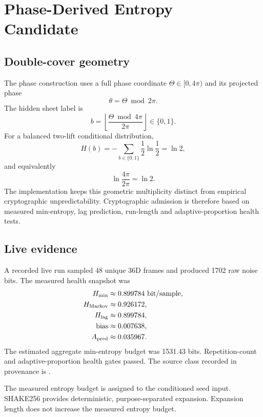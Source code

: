 
\chapter[Phase-Derived Entropy Candidate]{Phase-Derived Entropy\\Candidate}
\section{Double-cover geometry}
The phase construction uses a full phase coordinate $\Theta\in[0,4\pi)$ and its projected phase
\begin{equation}
\theta=\Theta\bmod 2\pi.
\end{equation}
The hidden sheet label is
\begin{equation}
b=\left\lfloor\frac{\Theta\bmod4\pi}{2\pi}\right\rfloor\in\{0,1\}.
\end{equation}
For a balanced two-lift conditional distribution,
\begin{equation}
H(b)=-\sum_{b\in\{0,1\}}\frac12\ln\frac12=\ln2,
\end{equation}
and equivalently
\begin{equation}
\ln\frac{4\pi}{2\pi}=\ln2.
\end{equation}
The implementation keeps this geometric multiplicity distinct from empirical cryptographic unpredictability. Cryptographic admission is therefore based on measured min-entropy, lag prediction, run-length and adaptive-proportion health tests.

\section{Live evidence}
A recorded live run sampled 48 unique 36D frames and produced 1702 raw noise bits. The measured health snapshot was
\begin{align}
H_{\min} &\approx 0.899784\ \text{bit/sample},\\
H_{\mathrm{Markov}} &\approx 0.926172,\\
H_{\mathrm{lag}} &\approx 0.899784,\\
\text{bias} &\approx 0.007638,\\
A_{\mathrm{pred}} &\approx 0.035967.
\end{align}
The estimated aggregate min-entropy budget was 1531.43 bits. Repetition-count and adaptive-proportion health gates passed. The source class recorded in provenance is .

\begin{resultbox}
The measured entropy budget is assigned to the conditioned seed input. SHAKE256 provides deterministic, purpose-separated expansion. Expansion length does not increase the measured entropy budget.
\end{resultbox}

